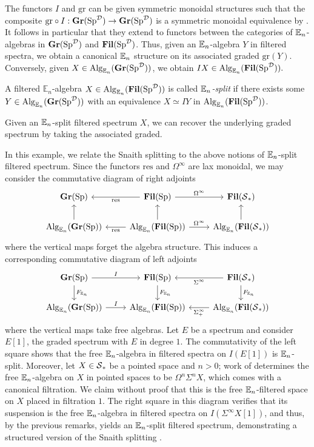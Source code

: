 The functors $I$ and $\text{gr}$ can be given symmetric monoidal structures such that the composite $\text{gr}\circ I : \operatorname{\mathbf{Gr}}(\operatorname{\mathrm{Sp}}^{\operatorname{\mathcal{D}}}) \to \operatorname{\mathbf{Gr}}(\operatorname{\mathrm{Sp}}^{\operatorname{\mathcal{D}}})$ is a symmetric monoidal equivalence by \cite[Proposition 3.2.1]{LurieRot}.  It follows in particular that they extend to functors between the categories of $\operatorname{\mathbb{E}}_n$-algebras in $\operatorname{\mathbf{Gr}}(\operatorname{\mathrm{Sp}}^{\operatorname{\mathcal{D}}})$ and $\operatorname{\mathbf{Fil}}(\operatorname{\mathrm{Sp}}^{\operatorname{\mathcal{D}}})$.  Thus, given an $\operatorname{\mathbb{E}}_n$-algebra $Y$ in filtered spectra, we obtain a canonical $\operatorname{\mathbb{E}}_n$ structure on its associated graded $\text{gr}(Y).$  Conversely, given $X\in \operatorname{\mathrm{Alg}}_{\operatorname{\mathbb{E}}_n}(\operatorname{\mathbf{Gr}}(\operatorname{\mathrm{Sp}}^{\operatorname{\mathcal{D}}}))$, we obtain $IX\in \operatorname{\mathrm{Alg}}_{\operatorname{\mathbb{E}}_n}(\operatorname{\mathbf{Fil}}(\operatorname{\mathrm{Sp}}^{\operatorname{\mathcal{D}}})).$  

\begin{dfn}
A filtered $\mathbb{E}_n$-algebra $X\in \operatorname{\mathrm{Alg}}_{\operatorname{\mathbb{E}}_n}(\operatorname{\mathbf{Fil}}(\operatorname{\mathrm{Sp}}^{\operatorname{\mathcal{D}}}))$ is called \emph{$\operatorname{\mathbb{E}}_n$-split} if there exists some $Y \in \operatorname{\mathrm{Alg}}_{\operatorname{\mathbb{E}}_n}(\operatorname{\mathbf{Gr}}(\operatorname{\mathrm{Sp}}^{\operatorname{\mathcal{D}}}))$ with an equivalence $X \simeq IY$ in $\operatorname{\mathrm{Alg}}_{\operatorname{\mathbb{E}}_n}(\operatorname{\mathbf{Fil}}(\operatorname{\mathrm{Sp}}^{\operatorname{\mathcal{D}}}))$.  
\end{dfn}

Given an $\operatorname{\mathbb{E}}_n$-split filtered spectrum $X$, we can recover the underlying graded spectrum by taking the associated graded.  

\begin{exm}\label{exm:snaith}
In this example, we relate the Snaith splitting to the above notions of $\operatorname{\mathbb{E}}_n$-split filtered spectrum.  Since the functors $\mathrm{res}$ and $\Omega^{\infty}$ are lax monoidal, we may consider the commutative diagram of right adjoints
$$
\begin{tikzcd}
\Gr(\Sp) & \Fil(\Sp) \arrow[l,"\mathrm{res}"] \arrow[r,"\Omega^{\infty}"] & \Fil(\cS_*) \\
\Alg_{\E_n}(\Gr(\Sp)) \arrow[u] & \Alg_{\E_n}(\Fil(\Sp))  \arrow[l,"\mathrm{res}"] \arrow[r,"\Omega^{\infty}"] \arrow[u]& \Alg_{\E_n}(\Fil(\cS_*)) \arrow[u]
\end{tikzcd}
$$
where the vertical maps forget the algebra structure.  This induces a corresponding commutative diagram of left adjoints
$$
\begin{tikzcd}
\Gr(\Sp) \arrow[r,"I"] \arrow[d,"F_{\E_n}"] & \Fil(\Sp)\arrow[d,"F_{\E_n}"] & \Fil(\cS_*) \arrow[d,"F_{\E_n}"]\arrow[l,"\Sigma^{\infty}"]\\
\Alg_{\E_n}(\Gr(\Sp))\arrow[r,"I"] & \Alg_{\E_n}(\Fil(\Sp))  & \Alg_{\E_n}(\Fil(\cS_*)) \arrow[l,"\Sigma^{\infty}_+"]
\end{tikzcd}
$$
where the vertical maps take free algebras.  Let $E$ be a spectrum and consider $E[1]$, the graded spectrum with $E$ in degree $1$.  The commutativity of the left square shows that the free $\operatorname{\mathbb{E}}_n$-algebra in filtered spectra on $I(E[1])$ is $\operatorname{\mathbb{E}}_n$-split.  Moreover, let $X\in \operatorname{\mathcal{S}}_*$ be a pointed space and $n>0$; work of \cite{May} determines the free $\operatorname{\mathbb{E}}_n$-algebra on $X$ in pointed spaces to be $\Omega^n \Sigma^n X$, which comes with a canonical filtration.  We claim without proof that this is the free $\operatorname{\mathbb{E}}_n$-filtered space on $X$ placed in filtration $1$.  The right square in this diagram verifies that its suspension is the free $\operatorname{\mathbb{E}}_n$-algebra in filtered spectra on $I(\Sigma^{\infty} X [1])$, and thus, by the previous remarks, yields an $\operatorname{\mathbb{E}}_n$-split filtered spectrum, demonstrating a structured version of the Snaith splitting \cite{SnaithSplit}.
\end{exm}

